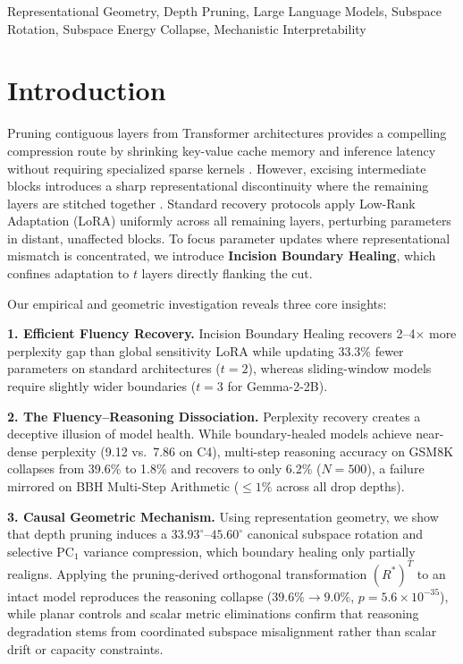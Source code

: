 \documentclass[pmlr,onecolumn]{jmlr}
\begin{document}
\begin{keywords}
Representational Geometry, Depth Pruning, Large Language Models, Subspace Rotation, Subspace Energy Collapse, Mechanistic Interpretability
\end{keywords}

\section{Introduction}

Pruning contiguous layers from Transformer architectures \citep{vaswani2017attention} provides a compelling compression route by shrinking key-value cache memory and inference latency without requiring specialized sparse kernels \citep{gromov2024unreasonable,siddiqui2024deeper,men-etal-2025-shortgpt}. However, excising intermediate blocks introduces a sharp representational discontinuity where the remaining layers are stitched together \citep{kim2024shortened,sheth2026cap}. Standard recovery protocols apply Low-Rank Adaptation (LoRA) \citep{hu2022lora,ma2023llmpruner} uniformly across all remaining layers, perturbing parameters in distant, unaffected blocks. To focus parameter updates where representational mismatch is concentrated, we introduce \textbf{Incision Boundary Healing}, which confines adaptation to $t$ layers directly flanking the cut.

Our empirical and geometric investigation reveals three core insights:

\textbf{1. Efficient Fluency Recovery.} Incision Boundary Healing recovers 2--4$\times$ more perplexity gap than global sensitivity LoRA while updating 33.3\% fewer parameters on standard architectures ($t=2$), whereas sliding-window models require slightly wider boundaries ($t=3$ for Gemma-2-2B).

\textbf{2. The Fluency--Reasoning Dissociation.} Perplexity recovery creates a deceptive illusion of model health. While boundary-healed models achieve near-dense perplexity (9.12 vs.\ 7.86 on C4), multi-step reasoning accuracy on GSM8K collapses from 39.6\% to 1.8\% and recovers to only 6.2\% ($N=500$), a failure mirrored on BBH Multi-Step Arithmetic ($\le 1\%$ across all drop depths).

\textbf{3. Causal Geometric Mechanism.} Using representation geometry, we show that depth pruning induces a $33.93^\circ$--$45.60^\circ$ canonical subspace rotation and selective $\mathrm{PC}_1$ variance compression, which boundary healing only partially realigns. Applying the pruning-derived orthogonal transformation $(R^*)^T$ to an intact model reproduces the reasoning collapse ($39.6\% \to 9.0\%$, $p = 5.6 \times 10^{-35}$), while planar controls and scalar metric eliminations confirm that reasoning degradation stems from coordinated subspace misalignment rather than scalar drift or capacity constraints.
\end{document}
